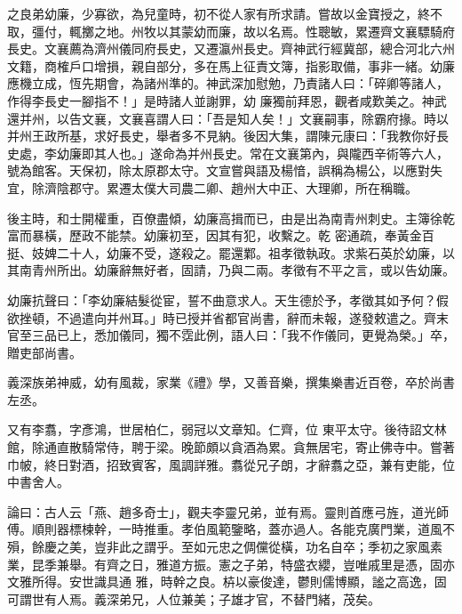 \begin{pinyinscope}
 之良弟幼廉，少寡欲，為兒童時，初不從人家有所求請。嘗故以金寶授之，終不取，彊付，輒擲之地。州牧以其蒙幼而廉，故以名焉。性聰敏，累遷齊文襄驃騎府長史。文襄薦為濟州儀同府長史，又遷瀛州長史。齊神武行經冀部，總合河北六州文籍，商榷戶口增損，親自部分，多在馬上征責文簿，指影取備，事非一緒。幼廉應機立成，恆先期會，為諸州準的。神武深加慰勉，乃責諸人曰：「碎卿等諸人，作得李長史一腳指不！」是時諸人並謝罪，幼
 廉獨前拜恩，觀者咸歎美之。神武還并州，以告文襄，文襄喜謂人曰：「吾是知人矣！」文襄嗣事，除霸府掾。時以并州王政所基，求好長史，舉者多不見納。後因大集，謂陳元康曰：「我教你好長史處，李幼廉即其人也。」遂命為并州長史。常在文襄第內，與隴西辛術等六人，號為館客。天保初，除太原郡太守。文宣嘗與語及楊愔，誤稱為楊公，以應對失宜，除濟陰郡守。累遷太僕大司農二卿、趙州大中正、大理卿，所在稱職。



 後主時，和士開權重，百僚盡傾，幼廉高揖而已，由是出為南青州刺史。主簿徐乾富而暴橫，歷政不能禁。幼廉初至，因其有犯，收繫之。乾
 密通疏，奉黃金百挺、妓婢二十人，幼廉不受，遂殺之。罷還鄴。祖孝徵執政。求紫石英於幼廉，以其南青州所出。幼廉辭無好者，固請，乃與二兩。孝徵有不平之言，或以告幼廉。



 幼廉抗聲曰：「李幼廉結髮從宦，誓不曲意求人。天生德於予，孝徵其如予何？假欲挫頓，不過遣向并州耳。」時已授并省都官尚書，辭而未報，遂發敕遣之。齊末官至三品已上，悉加儀同，獨不霑此例，語人曰：「我不作儀同，更覺為榮。」卒，贈吏部尚書。



 義深族弟神威，幼有風裁，家業《禮》學，又善音樂，撰集樂書近百卷，卒於尚書左丞。



 又有李翥，字彥鴻，世居柏仁，弱冠以文章知。仁齊，位
 東平太守。後待詔文林館，除通直散騎常侍，聘于梁。晚節頗以貪酒為累。貪無居宅，寄止佛寺中。嘗著巾帔，終日對酒，招致賓客，風調詳雅。翥從兄子朗，才辭翥之亞，兼有吏能，位中書舍人。



 論曰：古人云「燕、趙多奇士」，觀夫李靈兄弟，並有焉。靈則首應弓旌，道光師傅。順則器標楝幹，一時推重。孝伯風範鑒略，蓋亦過人。各能克廣門業，道風不殞，餘慶之美，豈非此之謂乎。至如元忠之倜儻從橫，功名自卒；季初之家風素業，昆季兼舉。有齊之日，雅道方振。憲之子弟，特盛衣纓，豈唯戚里是憑，固亦文雅所得。安世識具通
 雅，時幹之良。枿以豪俊達，鬱則儒博顯，謐之高逸，固可謂世有人焉。義深弟兄，人位兼美；子雄才官，不替門緒，茂矣。



\end{pinyinscope}